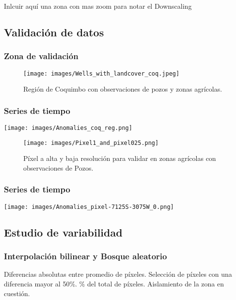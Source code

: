 \documentclass{beamer}
\begin{document}
  \begin{frame}
    \frametitle{}
    Inlcuir aquí una zona con mas zoom para notar el Downscaling
  \end{frame}

  \subsection*{Validación de datos}

  \begin{frame}
    \frametitle{Zona de validación}
    \begin{figure}
      \centering
      \texttt{[image: images/Wells\_with\_landcover\_coq.jpeg]}
      \caption{Región de Coquimbo con observaciones de pozos y zonas agrícolas.}
    \end{figure}

  \end{frame}

  \begin{frame}
    \frametitle{Series de tiempo}
    
    \centering
    \texttt{[image: images/Anomalies\_coq\_reg.png]}
  
  \end{frame}

  \begin{frame}
    \begin{figure}
      \centering
      \texttt{[image: images/Pixel1\_and\_pixel025.png]}
      \caption{Píxel a alta y baja resolución para validar en zonas agrícolas con observaciones de Pozos.}
    \end{figure}
  \end{frame}

  \begin{frame}
    \frametitle{Series de tiempo}
    
    \centering
    \texttt{[image: images/Anomalies\_pixel-7125S-3075W\_0.png]}
  \end{frame}



  \subsection*{Estudio de variabilidad}

  \begin{frame}
    \frametitle{Interpolación bilinear y Bosque aleatorio}

    \begin{outline}
      \1 Diferencias absolutas entre promedio de píxeles.
        \2 Selección de píxeles con una diferencia mayor al 50\%.
          \% del total de píxeles.
      \1 Aislamiento de la zona en cuestión.
    \end{outline}
  \end{frame}
\end{document}
